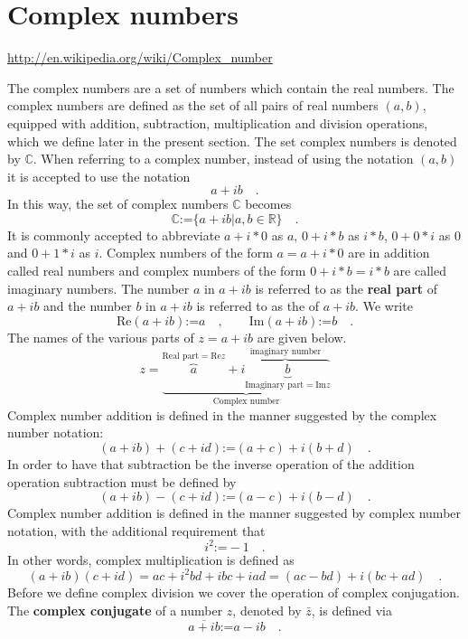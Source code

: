 \documentclass[12pt]{book}
\renewcommand{\Im}{\mathrm{Im}}
\renewcommand{\Re}{\mathrm{Re}}
\newcommand{\eqdef}{\textbf{:=}}
\renewcommand{\emph}{\textbf}
\begin{document}
\section{ Complex numbers}

\label{secComplexNumbers}

\noindent \url{http://en.wikipedia.org/wiki/Complex_number}

 The complex numbers are a set of numbers which contain the real numbers. The complex numbers are defined as the set of all pairs of real numbers $(a,b)$, equipped with addition, subtraction, multiplication and division operations, which we define later in the present section. The set complex numbers is denoted by $\mathbb C$. When referring to a complex number, instead of using the notation $(a,b)$ it is accepted to use the notation 
\[
a+i b\quad .
\]
In this way, the set of complex numbers $\mathbb C$ becomes 
\[
\mathbb C\eqdef \{a+ib| a,b\in \mathbb R\}\quad. 
\]
It is commonly accepted to abbreviate $ a+i*0$ as $a$, $0+i*b$ as $i*b$, $0+0*i$ as $0$ and $0+1*i$ as $i$. Complex numbers of the form $a=a+i*0$ are in addition called real numbers and complex numbers of the form $0+i*b=i*b$ are called imaginary numbers.   The number $a$ in $a+ib$ is referred to as the \emph{real part} of $a+ib$ and the number $b$ in $a+ib$ is referred to as the of $a+ib$. We write
\[
\Re (a+ib)\eqdef a \quad, \quad \quad \Im (a+ib)\eqdef b \quad .
\]
The names of the various parts of $z=a+ib$ are given below.
\[
z=\underbrace{\overbrace{a}^{\text{Real part}=\Re z}+ \overbrace{i\underbrace{b}_{\text{Imaginary part}=\Im z}}^{\text{imaginary number}} }_{\text{Complex number}}
\]
Complex number addition is defined in the manner suggested by the complex number notation:
\[(a+i b)+ (c+id)\eqdef (a+c) + i(b+d) \quad .
\]
In order to have that subtraction be the inverse operation of the addition operation subtraction must be defined by 
\[
(a+i b)- (c+id)\eqdef (a-c) + i(b-d) \quad .
\]
Complex number addition is defined in the manner suggested by complex number notation, with the additional requirement that
\[
i^2\eqdef -1\quad .
\]
In other words, complex multiplication is defined as
\[
(a+ i b)(c+id)=ac +i^2 bd +i bc + i ad= (ac-bd)+i(bc+ad) \quad .
\]
Before we define complex division we cover the operation of complex conjugation. The \emph{complex conjugate} of a number $z$, denoted by $\bar z$, is defined via
\[\overline{a+ib}\eqdef a-ib \quad .
\]
\end{document}
